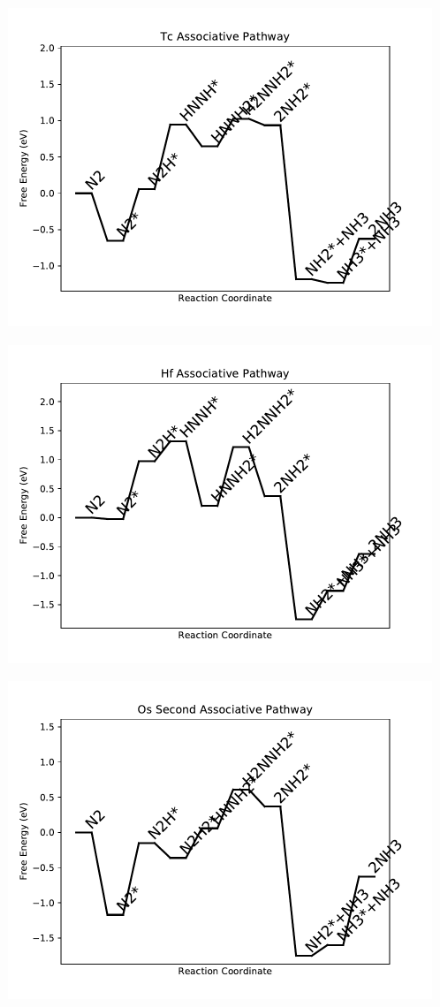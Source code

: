 \begin{figure}
\includegraphics[width=0.8\linewidth]{data/plots/Tc_associative.pdf}
\end{figure}

\begin{figure}
\includegraphics[width=0.8\linewidth]{data/plots/Hf_associative.pdf}
\end{figure}

\begin{figure}
\includegraphics[width=0.8\linewidth]{data/plots/Os_associative_2.pdf}
\end{figure}

